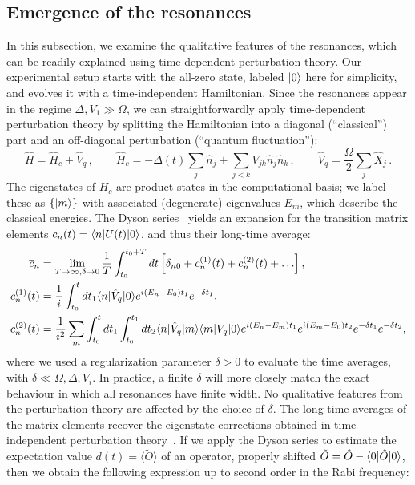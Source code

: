 \documentclass[english,floatfix,twocolumn,showpacs, aps, prx, reprint, superscriptaddress, longbibliography]{revtex4-2}
\begin{document}
\subsection{Emergence of the resonances}
\label{supp:sec:resonances_emergence}

In this subsection, we examine the qualitative features of the resonances, which can be readily explained using time-dependent perturbation theory. Our experimental setup starts with the all-zero state, labeled $\ket{0}$ here for simplicity, and evolves it with a time-independent Hamiltonian. Since the resonances appear in the regime $\Delta, V_1 \gg \Omega$, we can straightforwardly apply time-dependent perturbation theory by splitting the Hamiltonian into a diagonal (``classical'') part and an off-diagonal perturbation (``quantum fluctuation''):
\begin{equation}
\hat{H} = \hat{H}_c + \hat{V}_q \, , \qquad
\hat{H}_c = - \Delta (t) \sum_j \hat{n}_j + \sum_{j<k} V_{jk} \hat{n}_j \hat{n}_k \, , \qquad
\hat{V}_q = \frac{\Omega}{2}\sum_j\hat{X}_j \, .
\label{eq:ptham}
\end{equation}
The eigenstates of $H_c$ are product states in the computational basis; we label these as $\{ \ket{m}\}$ with associated (degenerate) eigenvalues $E_m$, which describe the classical energies. 
The Dyson series~\cite{Sakurai:1994} yields an expansion for the transition matrix elements $c_n (t) = \!\mel{n}{U(t)}{0}$, and thus their long-time average:
\begin{align}
\overline{c}_n &= \lim_{T \rightarrow \infty, \delta \rightarrow 0} \frac{1}{T}\int_{t_0}^{t_0 + T} dt \left[ \delta_{n0} + c_n^{(1)} (t) + c_n^{(2)} (t) + \hdots \right] , \label{eq:longtimeaverage_pt} \\
c_n^{(1)} (t) &= \frac{1}{i} \int_{t_0}^{t} dt_1 \!\mel{n}{\hat{V}_q}{0}\! e^{i(E_n-E_0)t_1} e^{-\delta t_1} , \notag \\
c_n^{(2)} (t) &= \frac{1}{i^2} \sum_{m} \int_{t_0}^{t} dt_1 \int_{t_0}^{t_1} dt_2 \!\mel{n}{\hat{V}_q}{m}\! \!\mel{m}{V_q}{0}\! e^{i(E_n-E_m)t_1} e^{i(E_m-E_0)t_2} e^{-\delta t_1} e^{-\delta t_2} , \notag
\end{align}
where we used a regularization parameter $\delta>0$ to evaluate the time averages, with $\delta \ll \Omega, \Delta, V_i$. In practice, a finite $\delta$ will more closely match the exact behaviour in which all resonances have finite width. No qualitative features from the perturbation theory are affected by the choice of $\delta$. The long-time averages of the matrix elements recover the eigenstate corrections obtained in time-independent perturbation theory~\cite{Sakurai:1994}. If we apply the Dyson series to estimate the expectation value $d(t) = \langle \tilde{O} \rangle$ of an operator, properly shifted $\tilde{O} = \hat{O} - \!\mel{0}{\hat{O}}{0}$, then we obtain the following expression up to second order in the Rabi frequency:
\end{document}
